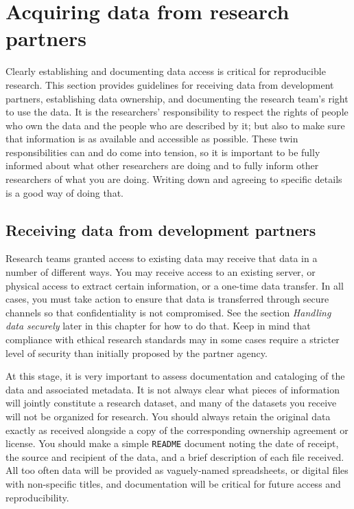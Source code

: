 \section{Acquiring data from research partners}

Clearly establishing and documenting data access is critical for reproducible research.
This section provides guidelines for receiving data from development partners,
establishing data ownership,
and documenting the research team's right to use the data.
It is the researchers' responsibility to respect the rights
of people who own the data and the people who are described by it;
but also to make sure that information is as available and accessible as possible.
These twin responsibilities can and do come into tension,
so it is important to be fully informed about what other researchers are doing
and to fully inform other researchers of what you are doing.
Writing down and agreeing to specific details is a good way of doing that.

\subsection{Receiving data from development partners}

Research teams granted access to existing data may receive that data in a number of different ways.
You may receive access to an existing server,
or physical access to extract certain information,
or a one-time data transfer.
In all cases, you must take action to ensure
that data is transferred through
secure channels so that confidentiality is not compromised.
See the section \textit{Handling data securely} later in this chapter for how to do that.
Keep in mind that compliance with ethical research standards may
in some cases require a stricter level of security than initially proposed by the partner agency.

At this stage, it is very important to assess
documentation and cataloging of the data and associated metadata.
It is not always clear what pieces of information will jointly constitute a research dataset,
and many of the datasets you receive will not be organized for research.
You should always retain the original data exactly as received
alongside a copy of the corresponding ownership agreement or license.
You should make a simple \texttt{README} document noting the date of receipt,
the source and recipient of the data,
and a brief description of each file received.
All too often data will be provided as vaguely-named spreadsheets,
or digital files with non-specific titles,
and documentation will be critical for future access and reproducibility.

